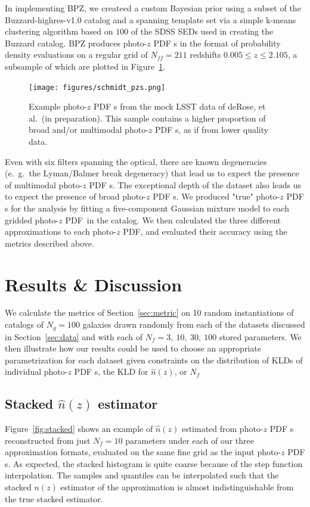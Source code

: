 \documentclass[\docopts]{\docclass}
\newcommand{\pz}{photo-$z$ PDF\xspace}
\begin{document}
In implementing BPZ, we createed a custom Bayesian prior using a subset of the 
Buzzard-highres-v1.0 catalog and a spanning template set via a simple k-means 
clustering algorithm based on $100$ of the SDSS SEDs used in creating the 
Buzzard catalog.
BPZ produces \pz s in the format of probability density evaluations on a 
regular grid of $N_{ff}=211$ redshifts $0.005\leq z\leq2.105$, a subsample of 
which are plotted in Figure~\ref{fig:schmidt_pzs}.

\begin{figure}
  \texttt{[image: figures/schmidt\_pzs.png]}
  \caption{Example \pz s from the mock LSST data of deRose, et al.\ (in 
preparation).
  This sample contains a higher proportion of broad and/or multimodal \pz s, as 
if from lower quality data.
  \label{fig:schmidt_pzs}}
\end{figure}

Even with six filters spanning the optical, there are known degeneracies 
(e.~g.~the Lyman/Balmer break degeneracy) that lead us to expect the presence 
of multimodal \pz s.
The exceptional depth of the dataset also leads us to expect the presence of 
broad \pz s.
We produced "true" \pz s for the analysis by fitting a five-component Gaussian 
mixture model to each gridded \pz\ in the catalog.
We then calculated the three different approximations to each \pz, and 
evaluated their accuracy using the metrics described above.


\section{Results \& Discussion}
\label{sec:results}


We calculate the metrics of Section~\ref{sec:metric} on 10 random 
instantiations of catalogs of $N_{g}=100$ galaxies drawn randomly from each of 
the datasets discussed in Section~\ref{sec:data} and with each of $N_{f}=3,\ 
10,\ 30,\ 100$ stored parameters.
We then illustrate how our results could be used to choose an appropriate 
parametrization for each dataset given constraints on the distribution of KLDs 
of individual \pz s, the KLD for $\hat{n}(z)$, or $N_{f}$


\subsection{Stacked $\hat{n}(z)$ estimator}
\label{sec:stacked_results}

Figure~\ref{fig:stacked} shows an example of $\hat{n}(z)$ estimated from \pz s 
reconstructed from just $N_{f}=10$ parameters under each of our three 
approximation formats, evaluated on the same fine grid as the input \pz s.
As expected, the stacked histogram is quite coarse because of the step function 
interpolation.
The samples and quantiles can be interpolated such that the stacked $n(z)$ 
estimator of the approximation is almost indistinguishable from the true 
stacked estimator.
\end{document}
